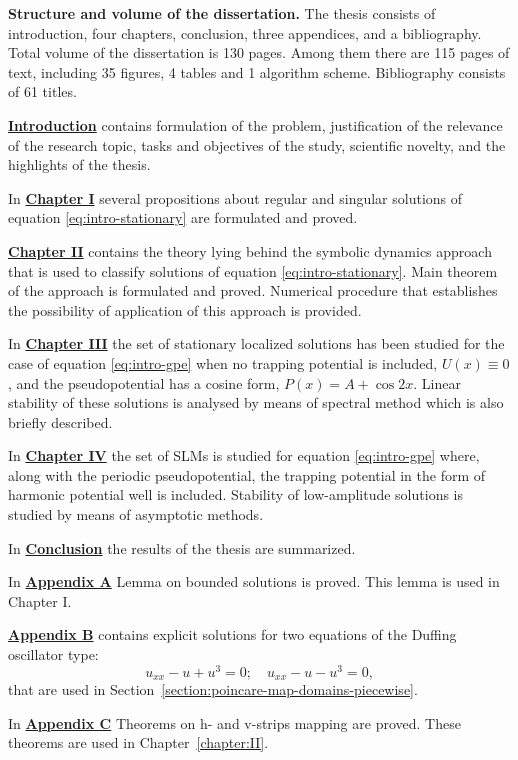 \textbf{Structure and volume of the dissertation.}
The thesis consists of introduction, four chapters, conclusion, three appendices, and a bibliography.
Total volume of the dissertation is 130 pages.
Among them there are 115 pages of text, including 35 figures, 4 tables and 1 algorithm scheme.
Bibliography consists of 61 titles.

\textbf{\hyperref[introduction]{Introduction}} contains formulation of the problem, justification of the relevance of the research topic, tasks and objectives of the study, scientific novelty, and the highlights of the thesis.

In \textbf{\hyperref[chapter:I]{Chapter I}} several propositions about regular and singular solutions of equation \eqref{eq:intro-stationary} are formulated and proved.

\textbf{\hyperref[chapter:II]{Chapter II}} contains the theory lying behind the symbolic dynamics approach that is used to classify solutions of equation \eqref{eq:intro-stationary}.
Main theorem of the approach is formulated and proved.
Numerical procedure that establishes the possibility of application of this approach is provided.

In \textbf{\hyperref[chapter:III]{Chapter III}} the set of stationary localized solutions has been studied for the case of equation \eqref{eq:intro-gpe} when no trapping potential is included, $U(x) \equiv 0$, and the pseudopotential has a cosine form, $P(x) = A + \cos 2x$.
Linear stability of these solutions is analysed by means of spectral method which is also briefly described.

In \textbf{\hyperref[chapter:IV]{Chapter IV}} the set of SLMs is studied for equation \eqref{eq:intro-gpe} where, along with the periodic pseudopotential, the trapping potential in the form of harmonic potential well is included.
Stability of low-amplitude solutions is studied by means of asymptotic methods.

In \textbf{\hyperref[conclusion]{Conclusion}} the results of the thesis are summarized.

In \textbf{\hyperref[appendix:lemma-on-bounded-solutions]{Appendix A}} Lemma on bounded solutions is proved.
This lemma is used in Chapter I.

\textbf{\hyperref[appendix:solutions-of-duffing-equations]{Appendix B}} contains explicit solutions for two equations of the Duffing oscillator type: 
\begin{equation}
	u_{xx} - u + u^3 = 0; \quad u_{xx} - u - u^3 = 0,
\end{equation}
that are used in Section~\ref{section:poincare-map-domains-piecewise}.

In \textbf{\hyperref[appendix:strips-mapping-theorems]{Appendix C}} Theorems on h- and v-strips mapping are proved.
These theorems are used in Chapter~\ref{chapter:II}.
